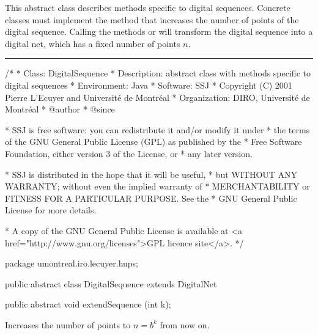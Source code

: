 
This abstract class describes methods specific to digital sequences.
Concrete classes must implement the  method
that increases the number of points of the digital sequence.
Calling the  methods  or 
will transform the digital sequence into a digital net, which has
a fixed number of points $n$.

\bigskip\hrule\bigskip

\begin{code}
\begin{hide}
/*
 * Class:        DigitalSequence
 * Description:  abstract class with methods specific to digital sequences
 * Environment:  Java
 * Software:     SSJ 
 * Copyright (C) 2001  Pierre L'Ecuyer and Université de Montréal
 * Organization: DIRO, Université de Montréal
 * @author       
 * @since

 * SSJ is free software: you can redistribute it and/or modify it under
 * the terms of the GNU General Public License (GPL) as published by the
 * Free Software Foundation, either version 3 of the License, or
 * any later version.

 * SSJ is distributed in the hope that it will be useful,
 * but WITHOUT ANY WARRANTY; without even the implied warranty of
 * MERCHANTABILITY or FITNESS FOR A PARTICULAR PURPOSE.  See the
 * GNU General Public License for more details.

 * A copy of the GNU General Public License is available at
   <a href="http://www.gnu.org/licenses">GPL licence site</a>.
 */
\end{hide}
package umontreal.iro.lecuyer.hups;


public abstract class DigitalSequence extends DigitalNet \begin{hide} { 

\end{hide}

   public abstract void extendSequence (int k);
\end{code} 
\begin{tabb}
    Increases the number of points to $n = b^k$ from now on.
\end{tabb}
\begin{htmlonly}
\end{htmlonly}
